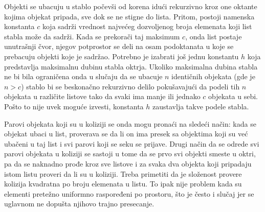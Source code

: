 \documentclass[12pt,oneside]{memoir}
\begin{document}
Objekti se ubacuju u stablo počevši od korena idući rekurzivno kroz one oktante kojima objekat pripada,
sve dok se ne stigne do lista.
Pritom, postoji namenska konstanta $c$ koja sadrži vrednost najvećeg dozvoljenog broja elemenata koji list stabla može da sadrži.
Kada se prekorači taj maksimum $c$, onda list postaje unutrašnji čvor, njegov potprostor se deli 
na osam podoktanata u koje se prebacuju objekti koje je sadržao.
Potrebno je izabrati još jednu konstantu $h$ koja predstavlja maksimalnu dubinu stabla oktrja.
Ukoliko maksimalna dubina stabla ne bi bila ograničena onda u slučaju da se ubacuje $n$ identičnih objekata (gde je $n > c$)
stablo bi se beskonačno rekurzivno delilo pokušavajući da podeli tih $n$ objekata u različite listove 
tako da svaki ima manje ili jednako $c$ objekata u sebi. 
Pošto to nije uvek moguće izvesti, konstanta $h$ zaustavlja takve podele stabla.

Parovi objekata koji su u koliziji se onda mogu pronaći na sledeći način:
kada se objekat ubaci u list, proverava se da li on ima presek sa objektima koji su već
ubačeni u taj list i svi parovi koji se seku se prijave.
Drugi način da se odrede svi parovi objekata u koliziji se sastoji u tome da se prvo svi objekti smeste u oktri, 
pa da se naknadno prođe kroz sve listove i za svaka dva objekta koji pripadaju istom listu proveri da li su u koliziji.
Treba primetiti da je složenost provere kolizija kvadratna po broju elemenata u listu.
To ipak nije problem kada su elementi pretežno uniformno raspoređeni po prostoru, što je često 
i slučaj jer se uglavnom ne dopušta njihovo trajno presecanje. 
\end{document}
